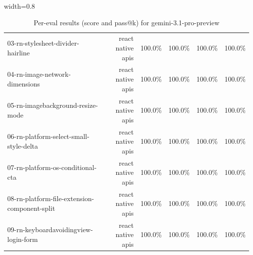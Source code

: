 \begin{table}[htbp]
\begin{adjustbox}{width=0.8\textwidth}
\begin{tabular}{lrrrrr}
03-rn-stylesheet-divider-hairline & react native apis & 100.0\% & 100.0\% & 100.0\% & 100.0\% \\
04-rn-image-network-dimensions & react native apis & 100.0\% & 100.0\% & 100.0\% & 100.0\% \\
05-rn-imagebackground-resize-mode & react native apis & 100.0\% & 100.0\% & 100.0\% & 100.0\% \\
06-rn-platform-select-small-style-delta & react native apis & 100.0\% & 100.0\% & 100.0\% & 100.0\% \\
07-rn-platform-os-conditional-cta & react native apis & 100.0\% & 100.0\% & 100.0\% & 100.0\% \\
08-rn-platform-file-extension-component-split & react native apis & 100.0\% & 100.0\% & 100.0\% & 100.0\% \\
09-rn-keyboardavoidingview-login-form & react native apis & 100.0\% & 100.0\% & 100.0\% & 100.0\% \\
\bottomrule
\end{tabular}
\end{adjustbox}
\caption{Per-eval results (score and pass@k) for gemini-3.1-pro-preview}
\end{table}
